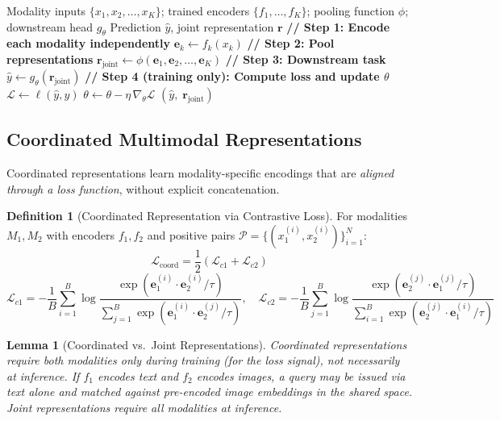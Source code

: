 \documentclass[12pt,a4paper]{article}
\theoremstyle{definition}
\newtheorem{definition}{Definition}[section]
\theoremstyle{plain}
\newtheorem{lemma}[theorem]{Lemma}
\theoremstyle{remark}
\newcommand{\R}{\mathbb{R}}
\begin{document}
\begin{algorithm}[H]
\caption{Joint Multimodal Representation (Concatenation)}
\label{alg:joint_repr}
\begin{algorithmic}[1]
\Require Modality inputs $\{x_1, x_2, \ldots, x_K\}$; trained encoders $\{f_1,\ldots,f_K\}$; pooling function $\phi$; downstream head $g_\theta$
\Ensure Prediction $\hat{y}$, joint representation $\mathbf{r}$
\State \textbf{// Step 1: Encode each modality independently}
  \State $\mathbf{e}_k \gets f_k(x_k)$ 
\EndFor
\State \textbf{// Step 2: Pool representations}
\State $\mathbf{r}_{\text{joint}} \gets \phi(\mathbf{e}_1, \mathbf{e}_2, \ldots, \mathbf{e}_K)$
  \Comment{e.g., concat: $\mathbf{r} \in \R^{\sum_k d_k}$}
\State \textbf{// Step 3: Downstream task}
\State $\hat{y} \gets g_\theta(\mathbf{r}_{\text{joint}})$
\State \textbf{// Step 4 (training only): Compute loss and update $\theta$}
  \State $\mathcal{L} \gets \ell(\hat{y}, y)$ 
  \State $\theta \gets \theta - \eta\,\nabla_\theta \mathcal{L}$
\EndIf
\State \Return $(\hat{y},\; \mathbf{r}_{\text{joint}})$
\end{algorithmic}
\end{algorithm}

\subsection{Coordinated Multimodal Representations}

Coordinated representations learn modality-specific encodings that are \emph{aligned through a loss function}, without explicit concatenation.

\begin{definition}[Coordinated Representation via Contrastive Loss]
For modalities $M_1, M_2$ with encoders $f_1, f_2$ and positive pairs $\mathcal{P} = \{(x_1^{(i)}, x_2^{(i)})\}_{i=1}^N$:
\[
  \mathcal{L}_{\text{coord}} = \frac{1}{2}(\mathcal{L}_{c1} + \mathcal{L}_{c2})
\]
\[
  \mathcal{L}_{c1} = -\frac{1}{B}\sum_{i=1}^B \log\frac{\exp(\mathbf{e}_1^{(i)} \cdot \mathbf{e}_2^{(i)} / \tau)}{\sum_{j=1}^B \exp(\mathbf{e}_1^{(i)} \cdot \mathbf{e}_2^{(j)} / \tau)}, \quad
  \mathcal{L}_{c2} = -\frac{1}{B}\sum_{j=1}^B \log\frac{\exp(\mathbf{e}_2^{(j)} \cdot \mathbf{e}_1^{(j)} / \tau)}{\sum_{i=1}^B \exp(\mathbf{e}_2^{(j)} \cdot \mathbf{e}_1^{(i)} / \tau)}
\]
\end{definition}

\begin{lemma}[Coordinated vs.\ Joint Representations]
Coordinated representations require both modalities only during training (for the loss signal), not necessarily at inference. If $f_1$ encodes text and $f_2$ encodes images, a query may be issued via text alone and matched against pre-encoded image embeddings in the shared space. Joint representations require all modalities at inference.
\end{lemma}
\end{document}
